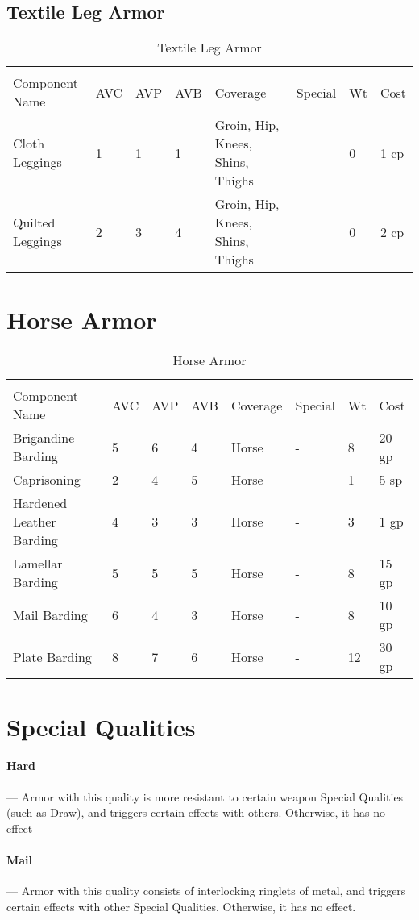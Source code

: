 \documentclass[oneside,11pt,english]{book}
\begin{document}
\subsection{Textile Leg Armor}
\begin{longtabu}to 
	\captionsetup{textformat=empty, labelformat=blank}
	\caption{Textile Leg Armor} \vspace{-15pt}
	\label{tab:Textile Leg Armor}\\
Component Name&AVC&AVP&AVB& Coverage& Special& Wt&Cost\\\toprule
Cloth Leggings& 1& 1& 1& Groin, Hip, Knees, 
Shins, Thighs& & 0& 1 cp\\
Quilted Leggings& 2& 3& 4& Groin, Hip, Knees, 
Shins, Thighs& & 0& 2 cp\\
\end{longtabu}

\section{Horse Armor}
\begin{longtabu} to 
	\captionsetup{textformat=empty, labelformat=blank}
	\caption{Horse Armor} \vspace{-15pt}
	\label{tab:Horse Armor}\\
Component Name&AVC&AVP&AVB& Coverage& Special& Wt&Cost\\\toprule
Brigandine 
Barding& 5& 6& 4& Horse& -& 8& 20 gp\\
Caprisoning& 2& 4& 5& Horse& & 1& 5 sp\\
Hardened Leather Barding& 4& 3& 3& Horse& -& 3& 1 gp\\
Lamellar Barding& 5& 5& 5& Horse& -& 8& 15 gp\\
Mail Barding& 6& 4& 3& Horse& -& 8& 10 gp\\
Plate Barding& 8& 7& 6& Horse& -& 12& 30 gp\\
\end{longtabu}

\section{Special Qualities}
\paragraph{\label{par:Hard}Hard}---\quad
	Armor with this quality is more resistant to certain weapon Special Qualities (such as Draw), and triggers certain effects with others. Otherwise, it has no effect
\vspace*{-10pt}\paragraph{\label{par:Mail}Mail}---\quad
	Armor with this quality consists of interlocking ringlets of metal, and triggers certain effects with other Special Qualities. Otherwise, it has no effect.
\end{document}
